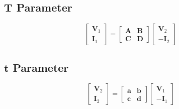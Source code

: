 	\vspace{-4mm}
	\subsection*{$\mathbf{T}$ Parameter} \label{subsec:T Parameter}
		\begin{equation*} \label{eq:T Parameter}
			\begin{bmatrix}
				\mathbf{V}_{1} \\
				\mathbf{I}_{1} 
			\end{bmatrix}
			=\begin{bmatrix}
				\mathbf{A} & \mathbf{B} \\
				\mathbf{C} & \mathbf{D}
			\end{bmatrix}
			\begin{bmatrix}
				\mathbf{V}_{2} \\
				\mathbf{-I}_{2} 
			\end{bmatrix}
	\end{equation*}
	
	\vspace{-4mm}
	\subsection*{$\mathbf{t}$ Parameter} \label{subsec:t Parameter}
		\begin{equation*} \label{eq:t Parameter}
			\begin{bmatrix}
				\mathbf{V}_{2} \\
				\mathbf{I}_{2} 
			\end{bmatrix}
			=\begin{bmatrix}
				\mathbf{a} & \mathbf{b} \\
				\mathbf{c} & \mathbf{d}
			\end{bmatrix}
			\begin{bmatrix}
				\mathbf{V}_{1} \\
				\mathbf{-I}_{1} 
			\end{bmatrix}
		\end{equation*}
	
	\vspace{-4mm}
